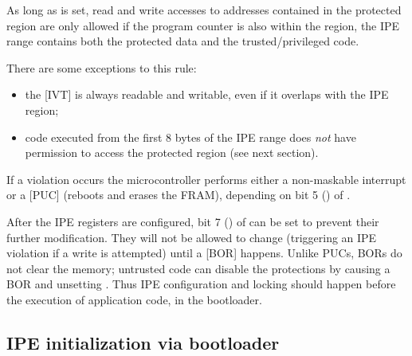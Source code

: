 As long as  is set, read and write accesses to addresses contained in the protected region are only allowed if the program counter is also within the region, \ie the IPE range contains both the protected data and the trusted/privileged code.

There are some exceptions to this rule:
\begin{itemize}
\item the [IVT] is always readable and writable, even if it overlaps with the IPE region; %
\item code executed from the first 8 bytes of the IPE range does \emph{not} have permission to access the protected region (see next section).
\end{itemize}

If a violation occurs the microcontroller performs either a non-maskable interrupt or a [PUC] (\ie reboots and erases the FRAM), depending on bit 5 () of .

After the IPE registers are configured, bit 7 () of  can be set to prevent their further modification. They will not be allowed to change (triggering an IPE violation if a write is attempted) until a [BOR] happens. Unlike PUCs, BORs do not clear the memory;
untrusted code can disable the protections by causing a BOR and unsetting . Thus IPE configuration and locking should happen before the execution of application code, \ie in the bootloader.



\subsection{IPE initialization via bootloader}
\label{sec:bootloader}

